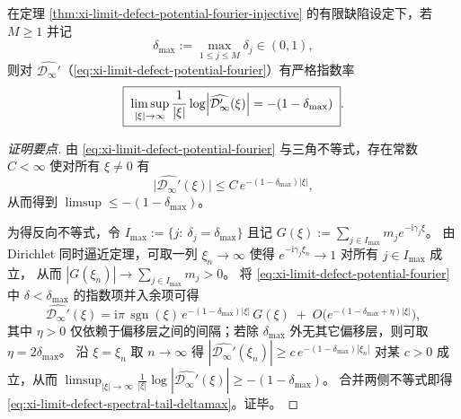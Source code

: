 \begin{corollary}[谱尾指数读取最大离线偏移]\label{cor:xi-limit-defect-potential-spectral-tail-reads-deltamax}
在定理 \ref{thm:xi-limit-defect-potential-fourier-injective} 的有限缺陷设定下，若 \(M\ge 1\) 并记
\[
\delta_{\max}:=\max_{1\le j\le M}\delta_j\in(0,1),
\]
则对 \(\widehat{\mathcal{D}_\infty'}\)（\eqref{eq:xi-limit-defect-potential-fourier}）有严格指数率
\begin{equation}\label{eq:xi-limit-defect-spectral-tail-deltamax}
\boxed{\;
\limsup_{|\xi|\to\infty}\frac{1}{|\xi|}\log\Bigl|\widehat{\mathcal{D}_\infty'}(\xi)\Bigr|
=-(1-\delta_{\max})\; } .
\end{equation}
\end{corollary}
\begin{proof}[证明要点]
由 \eqref{eq:xi-limit-defect-potential-fourier} 与三角不等式，存在常数 \(C<\infty\) 使对所有 \(\xi\neq 0\) 有
\[
\bigl|\widehat{\mathcal{D}_\infty'}(\xi)\bigr|
\le C\,e^{-(1-\delta_{\max})|\xi|},
\]
从而得到 \(\limsup\le -(1-\delta_{\max})\)。
\par
为得反向不等式，令 \(I_{\max}:=\{j:\ \delta_j=\delta_{\max}\}\) 且记
\(
G(\xi):=\sum_{j\in I_{\max}} m_j e^{-\mathrm{i}\gamma_j\xi}
\)。
由 Dirichlet 同时逼近定理，可取一列 \(\xi_n\to\infty\) 使得 \(e^{-\mathrm{i}\gamma_j\xi_n}\to 1\) 对所有 \(j\in I_{\max}\) 成立，
从而 \(|G(\xi_n)|\to \sum_{j\in I_{\max}}m_j>0\)。
将 \eqref{eq:xi-limit-defect-potential-fourier} 中 \(\delta<\delta_{\max}\) 的指数项并入余项可得
\[
\widehat{\mathcal{D}_\infty'}(\xi)
=\mathrm{i}\pi\,\operatorname{sgn}(\xi)\,e^{-(1-\delta_{\max})|\xi|}\,G(\xi)
\;+\;O\!\bigl(e^{-(1-\delta_{\max}+\eta)|\xi|}\bigr),
\]
其中 \(\eta>0\) 仅依赖于偏移层之间的间隔；若除 \(\delta_{\max}\) 外无其它偏移层，则可取 \(\eta=2\delta_{\max}\)。
沿 \(\xi=\xi_n\) 取 \(n\to\infty\) 得
\(
|\widehat{\mathcal{D}_\infty'}(\xi_n)|\ge c\,e^{-(1-\delta_{\max})|\xi_n|}
\)
对某 \(c>0\) 成立，从而
\(
\limsup_{|\xi|\to\infty}\frac{1}{|\xi|}\log|\widehat{\mathcal{D}_\infty'}(\xi)|
\ge -(1-\delta_{\max})
\)。
合并两侧不等式即得 \eqref{eq:xi-limit-defect-spectral-tail-deltamax}。证毕。
\end{proof}

\endinput

